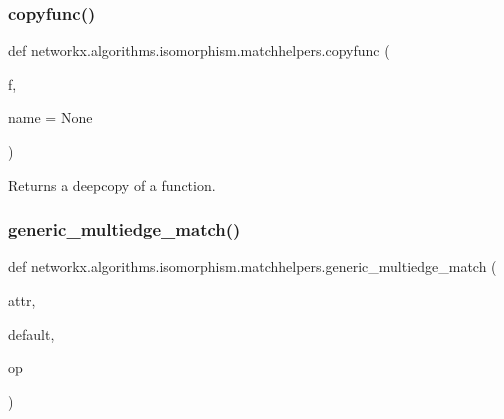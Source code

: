\subsubsection{\texorpdfstring{copyfunc()}{copyfunc()}}
{\footnotesize\ttfamily def networkx.\+algorithms.\+isomorphism.\+matchhelpers.\+copyfunc (\begin{DoxyParamCaption}\item[{}]{f,  }\item[{}]{name = {\ttfamily None} }\end{DoxyParamCaption})}

\begin{DoxyVerb}Returns a deepcopy of a function.\end{DoxyVerb}
 \mbox{\label{namespacenetworkx_1_1algorithms_1_1isomorphism_1_1matchhelpers_a23f2515abfe9edcda3beba0403fb1ad5}} 
\subsubsection{\texorpdfstring{generic\+\_\+multiedge\+\_\+match()}{generic\_multiedge\_match()}}
{\footnotesize\ttfamily def networkx.\+algorithms.\+isomorphism.\+matchhelpers.\+generic\+\_\+multiedge\+\_\+match (\begin{DoxyParamCaption}\item[{}]{attr,  }\item[{}]{default,  }\item[{}]{op }\end{DoxyParamCaption})}

